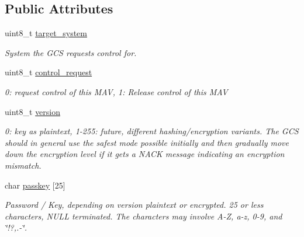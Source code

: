 \subsection*{Public Attributes}
\begin{DoxyCompactItemize}
\item 
\hypertarget{struct____mavlink__change__operator__control__t_ac68f72fea3c066f00e0ccd0b978d119a}{uint8\+\_\+t \hyperlink{struct____mavlink__change__operator__control__t_ac68f72fea3c066f00e0ccd0b978d119a}{target\+\_\+system}}\label{struct____mavlink__change__operator__control__t_ac68f72fea3c066f00e0ccd0b978d119a}

\begin{DoxyCompactList}\small\item\em System the G\+C\+S requests control for. \end{DoxyCompactList}\item 
\hypertarget{struct____mavlink__change__operator__control__t_aef19fec531d51e7a3f57fe09a7f74c06}{uint8\+\_\+t \hyperlink{struct____mavlink__change__operator__control__t_aef19fec531d51e7a3f57fe09a7f74c06}{control\+\_\+request}}\label{struct____mavlink__change__operator__control__t_aef19fec531d51e7a3f57fe09a7f74c06}

\begin{DoxyCompactList}\small\item\em 0\+: request control of this M\+A\+V, 1\+: Release control of this M\+A\+V \end{DoxyCompactList}\item 
\hypertarget{struct____mavlink__change__operator__control__t_a033ed1de1f96ee19a64572952e29da39}{uint8\+\_\+t \hyperlink{struct____mavlink__change__operator__control__t_a033ed1de1f96ee19a64572952e29da39}{version}}\label{struct____mavlink__change__operator__control__t_a033ed1de1f96ee19a64572952e29da39}

\begin{DoxyCompactList}\small\item\em 0\+: key as plaintext, 1-\/255\+: future, different hashing/encryption variants. The G\+C\+S should in general use the safest mode possible initially and then gradually move down the encryption level if it gets a N\+A\+C\+K message indicating an encryption mismatch. \end{DoxyCompactList}\item 
\hypertarget{struct____mavlink__change__operator__control__t_a6d90be6cd729954dbc7fa10d440f9cd2}{char \hyperlink{struct____mavlink__change__operator__control__t_a6d90be6cd729954dbc7fa10d440f9cd2}{passkey} \mbox{[}25\mbox{]}}\label{struct____mavlink__change__operator__control__t_a6d90be6cd729954dbc7fa10d440f9cd2}

\begin{DoxyCompactList}\small\item\em Password / Key, depending on version plaintext or encrypted. 25 or less characters, N\+U\+L\+L terminated. The characters may involve A-\/\+Z, a-\/z, 0-\/9, and \char`\"{}!?,.-\/\char`\"{}. \end{DoxyCompactList}\end{DoxyCompactItemize}


